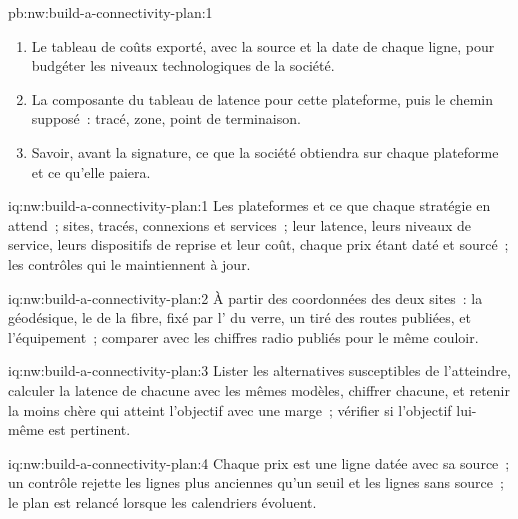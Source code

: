 \begin{solution}{pb:nw:build-a-connectivity-plan:1}
\begin{enumerate}[resume]
\item Le tableau de coûts exporté, avec la source et la date de chaque ligne, pour budgéter les niveaux technologiques de la société.
\item La composante du tableau de latence pour cette plateforme, puis le chemin supposé~: tracé, zone, point de terminaison.
\item Savoir, avant la signature, ce que la société obtiendra sur chaque plateforme et ce qu'elle paiera.
\end{enumerate}
\end{solution}

\begin{solution}{iq:nw:build-a-connectivity-plan:1}
Les plateformes et ce que chaque stratégie en attend~; sites, tracés, connexions et services~; leur latence, leurs niveaux de service, leurs dispositifs de reprise
et leur coût, chaque prix étant daté et sourcé~; les contrôles qui le maintiennent à jour.
\end{solution}

\begin{solution}{iq:nw:build-a-connectivity-plan:2}
À partir des coordonnées des deux sites~: la géodésique, le  de la fibre, fixé par l' du verre, un  tiré des routes publiées, et
l'équipement~; comparer avec les chiffres radio publiés pour le même couloir.
\end{solution}

\begin{solution}{iq:nw:build-a-connectivity-plan:3}
Lister les alternatives susceptibles de l'atteindre, calculer la latence de chacune avec les mêmes modèles, chiffrer chacune, et retenir la moins chère qui atteint
l'objectif avec une marge~; vérifier si l'objectif lui-même est pertinent.
\end{solution}

\begin{solution}{iq:nw:build-a-connectivity-plan:4}
Chaque prix est une ligne datée avec sa source~; un contrôle rejette les lignes plus anciennes qu'un seuil et les lignes sans source~; le plan est relancé
lorsque les calendriers évoluent.
\end{solution}

